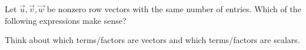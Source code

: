 \documentclass{ximera}
\author{Bart Snapp}
\begin{document}
\begin{exercise}
  Let $\vec{u},\vec{v},\vec{w}$ be nonzero row vectors with the same number of entries. Which of
  the following expressions make sense?
  \begin{selectAll}
  \end{selectAll}
  \begin{hint}
    Think about which terms/factors are vectors and which
    terms/factors are scalars.
  \end{hint}



  \end{exercise}
  
\end{document}

